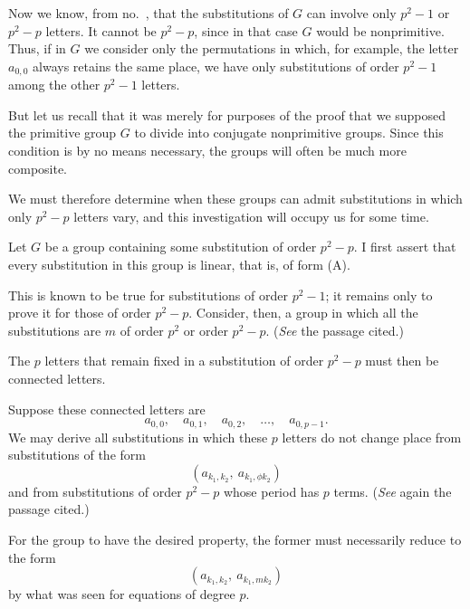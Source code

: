 Now we know, from no.~\GalHistoricalFootnoteMark{*}, that the substitutions of
$G$ can involve only $p^{2}-1$ or $p^{2}-p$ letters. It cannot be $p^{2}-p$,
since in that case $G$ would be nonprimitive. Thus, if in $G$ we consider only
the permutations in which, for example, the letter $a_{0,0}$ always retains
the same place, we have only substitutions of order $p^{2}-1$ among the other
$p^{2}-1$ letters.

But let us recall that it was merely for purposes of the proof that we supposed
the primitive group $G$ to divide into conjugate nonprimitive groups. Since
this condition is by no means necessary, the groups will often be much more
composite.

We must therefore determine when these groups can admit substitutions in which
only $p^{2}-p$ letters vary, and this investigation will occupy us for some time.

Let $G$ be a group containing some substitution of order $p^{2}-p$. I first
assert that every substitution in this group is linear, that is, of form (A).

This is known to be true for substitutions of order $p^{2}-1$; it remains only
to prove it for those of order $p^{2}-p$. Consider, then, a group in which all
the substitutions are $m$ of order $p^{2}$ or order $p^{2}-p$. (\emph{See}
the passage cited.)

The $p$ letters that remain fixed in a substitution of order $p^{2}-p$ must
then be connected letters.

Suppose these connected letters are
\[
a_{0,0},\quad a_{0,1},\quad a_{0,2},\quad \dots, \quad a_{0,p-1}.
\]
We may derive all substitutions in which these $p$ letters do not change place
from substitutions
of the form
\[
(a_{k_{1},k_{2}},\ a_{k_{1},\phi k_{2}})
\]
and from substitutions of order $p^{2}-p$ whose period has $p$ terms.
(\emph{See} again the passage cited.)

For the group to have the desired property, the former must necessarily reduce
to the form
\[
(a_{k_{1},k_{2}},\ a_{k_{1},m k_{2}})
\]
by what was seen for equations of degree $p$.

